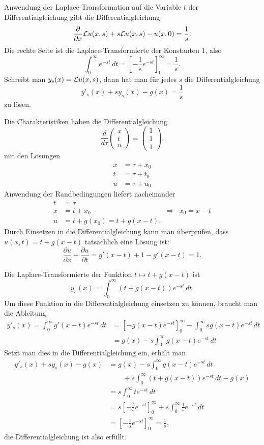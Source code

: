 \begin{loesung}
\begin{teilaufgaben}
\item
Anwendung der Laplace-Transformation auf die Variable $t$ der
Differentialgleichung gibt die Differentialgleichung
\[
\frac{\partial}{\partial x}{\cal L}u(x,s)
+s{\cal L}u(x,s)-u(x,0)=\frac1s.
\]
Die rechte Seite ist die Laplace-Transformierte der Konstanten
$1$, also
\[
\int_0^\infty e^{-st}\,dt
=
\left[
-\frac1s e^{-st}
\right]_0^\infty=\frac1s.
\]
Schreibt man $y_s(x)={\cal L}u(x,s)$, dann hat man
für jedes $s$  die Differentialgleichung
\[
y'_s(x)+sy_s(x)-g(x)=\frac1s
\]
zu lösen.
\item
Die Charakteristiken haben die Differentialgleichung
\[
\frac{d}{d\tau}\begin{pmatrix}
x\\t\\u
\end{pmatrix}
=\begin{pmatrix}
1\\1\\1
\end{pmatrix}.
\]
mit den Lösungen
\begin{align*}
x&=\tau + x_0\\
t&=\tau + t_0\\
u&=\tau + u_0
\end{align*}
Anwendung der Randbedingungen liefert nacheinander
\begin{align*}
t&=\tau\\
x&=t+x_0
&\Rightarrow&x_0=x-t\\
u&=t+g(x_0)=t+g(x-t).
\end{align*}
Durch Einsetzen in die Differentialgleichung kann man überprüfen,
dass $u(x,t)=t+g(x-t)$ tatsächlich eine Lösung ist:
\[
\frac{\partial u}{\partial x}+\frac{\partial u}{\partial t}
=
g'(x-t)+1-g'(x-t)=1.
\]
\item
Die Laplace-Transformierte der Funktion $t\mapsto t+g(x-t)$ ist
\[
y_s(x)=\int_0^\infty (t+g(x-t))e^{-st}\,dt.
\]
Um diese Funktion in die Differentialgleichung einsetzen zu können,
braucht man die Ableitung
\begin{align*}
y'_s(x)=\int_0^\infty g'(x-t)e^{-st}\,dt
&=\left[-g(x-t)e^{-st}\right]_0^\infty
-\int_0^\infty sg(x-t)e^{-st}\,dt
\\
&=g(x)-s\int_0^\infty g(x-t) e^{-st}\,dt
\end{align*}
Setzt man dies in die Differentialgleichung ein, erhält man
\begin{align*}
y'_s(x)+sy_s(x)-g(x)&=g(x)-s\int_0^\infty g(x-t)e^{-st}\,dt
\\
&\qquad
+s\int_0^\infty (t+g(x-t)) e^{-st}\,dt-g(x)
\\
&=s\int_0^\infty te^{-st}\,dt
\\
&=s\left[-\frac{t}{s}e^{-st}\right]_0^\infty
+s\int_0^\infty\frac{1}{s}e^{-st}\,dt
\\
&=\left[-\frac1s e^{-st}\right]_0^\infty
=\frac1s,
\end{align*}
die Differentialgleichung ist also erfüllt.
\qedhere
\end{teilaufgaben}
\end{loesung}

